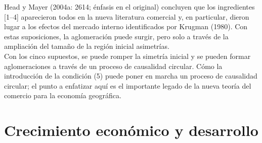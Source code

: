 Head y Mayer (2004a: 2614; énfasis en el original) concluyen que los ingredientes [1–4] aparecieron todos en la nueva literatura comercial y, en particular, dieron lugar a los efectos del mercado interno identificados por Krugman (1980). Con estas suposiciones, la aglomeración puede surgir, pero solo a través de la ampliación del tamaño de la región inicial asimetrías. \\
Con los cinco supuestos, se puede romper la simetría inicial y se pueden formar aglomeraciones a través de un proceso de causalidad circular. Cómo la introducción de la condición (5) puede poner en marcha un proceso de causalidad circular; el punto a enfatizar aquí es el importante legado de la nueva teoría del comercio para la economía geográfica. 

\section{Crecimiento económico y desarrollo}
